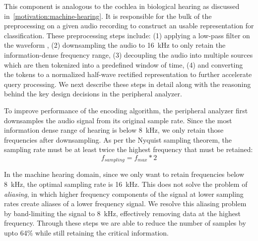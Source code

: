 This component is analogous to the cochlea in biological hearing as discussed
in~\autoref{motivation:machine-hearing}.
%
It is responsible for the bulk of the preprocessing on a given audio recording
to construct an usable representation for classification.
%
These preprocessing steps include: 
(1) applying a low-pass filter on the waveform , 
%
(2) downsampling the audio to 16~kHz to only retain the information-dense
frequency range, 
%
(3) decoupling the audio into multiple sources which are then tokenized into a
predefined window of time, 
%
(4) and converting the tokens to a normalized half-wave rectified 
representation to further accelerate query processing.
%
We next describe these steps in detail along with the reasoning behind the 
key design decisions in the peripheral analyzer.

%
To improve performance of the encoding algorithm, the peripheral analyzer first 
downsamples the audio signal from its original sample rate.
%
Since the most information dense range of hearing is below 8~kHz,
we only retain those frequencies after downsampling.
%
As per the Nyquist sampling theorem, the sampling rate must be at
least twice the highest frequency that must be retained:
\begin{equation} \label{eq:nyq}
    f_{sampling} = f_{max} * 2
\end{equation}

In the machine hearing domain, since we only want to retain frequencies below
8~kHz, the optimal sampling rate is 16~kHz. 
%
This does not solve the problem of \textit{aliasing}, 
in which higher frequency components of the signal at lower sampling rates
create aliases of a lower frequency signal.
%
We resolve this aliasing problem by band-limiting the signal to 8~kHz,
effectively removing data at the highest frequency. 
%
Through these steps we are able to reduce the number of samples by upto
64\% while still retaining the critical information.

